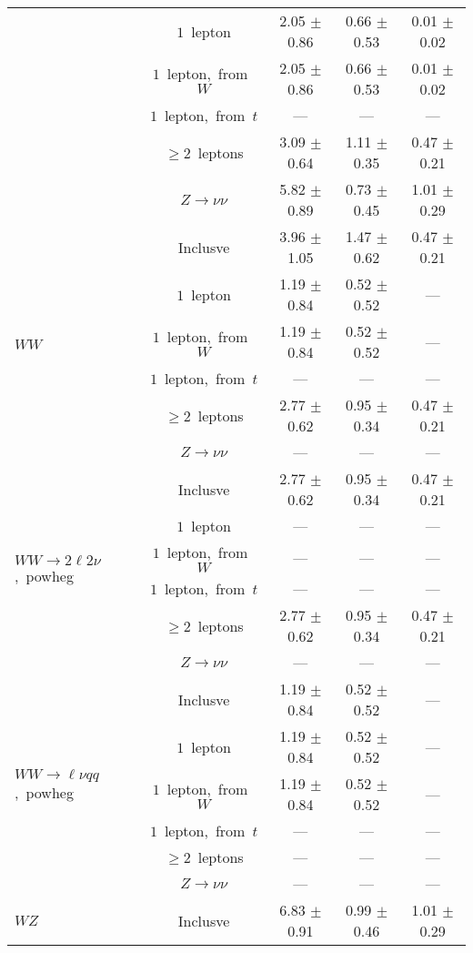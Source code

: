 \documentclass{article}
\begin{document}
\begin{longtable}{|l|c|c|c|c|}
 & $1$~lepton  & 2.05 $\pm$ 0.86  & 0.66 $\pm$ 0.53  & 0.01 $\pm$ 0.02 \\* 
 & $1$~lepton,~from~$W$  & 2.05 $\pm$ 0.86  & 0.66 $\pm$ 0.53  & 0.01 $\pm$ 0.02 \\* 
 & $1$~lepton,~from~$t$  & ---  & ---  & --- \\* 
 & $\ge2$~leptons  & 3.09 $\pm$ 0.64  & 1.11 $\pm$ 0.35  & 0.47 $\pm$ 0.21 \\* 
 & $Z\rightarrow\nu\nu$  & 5.82 $\pm$ 0.89  & 0.73 $\pm$ 0.45  & 1.01 $\pm$ 0.29 \\* 
\hline 
\multirow{6}{*}{$WW$} & Inclusve  & 3.96 $\pm$ 1.05  & 1.47 $\pm$ 0.62  & 0.47 $\pm$ 0.21 \\* 
 & $1$~lepton  & 1.19 $\pm$ 0.84  & 0.52 $\pm$ 0.52  & --- \\* 
 & $1$~lepton,~from~$W$  & 1.19 $\pm$ 0.84  & 0.52 $\pm$ 0.52  & --- \\* 
 & $1$~lepton,~from~$t$  & ---  & ---  & --- \\* 
 & $\ge2$~leptons  & 2.77 $\pm$ 0.62  & 0.95 $\pm$ 0.34  & 0.47 $\pm$ 0.21 \\* 
 & $Z\rightarrow\nu\nu$  & ---  & ---  & --- \\* 
\hline 
\multirow{6}{*}{$WW{\rightarrow}2\ell2\nu$,~powheg} & Inclusve  & 2.77 $\pm$ 0.62  & 0.95 $\pm$ 0.34  & 0.47 $\pm$ 0.21 \\* 
 & $1$~lepton  & ---  & ---  & --- \\* 
 & $1$~lepton,~from~$W$  & ---  & ---  & --- \\* 
 & $1$~lepton,~from~$t$  & ---  & ---  & --- \\* 
 & $\ge2$~leptons  & 2.77 $\pm$ 0.62  & 0.95 $\pm$ 0.34  & 0.47 $\pm$ 0.21 \\* 
 & $Z\rightarrow\nu\nu$  & ---  & ---  & --- \\* 
\hline 
\multirow{6}{*}{$WW{\rightarrow}{\ell}{\nu}qq$,~powheg} & Inclusve  & 1.19 $\pm$ 0.84  & 0.52 $\pm$ 0.52  & --- \\* 
 & $1$~lepton  & 1.19 $\pm$ 0.84  & 0.52 $\pm$ 0.52  & --- \\* 
 & $1$~lepton,~from~$W$  & 1.19 $\pm$ 0.84  & 0.52 $\pm$ 0.52  & --- \\* 
 & $1$~lepton,~from~$t$  & ---  & ---  & --- \\* 
 & $\ge2$~leptons  & ---  & ---  & --- \\* 
 & $Z\rightarrow\nu\nu$  & ---  & ---  & --- \\* 
\hline 
\multirow{6}{*}{$WZ$} & Inclusve  & 6.83 $\pm$ 0.91  & 0.99 $\pm$ 0.46  & 1.01 $\pm$ 0.29 \\* 

\end{longtable}
\end{document}

